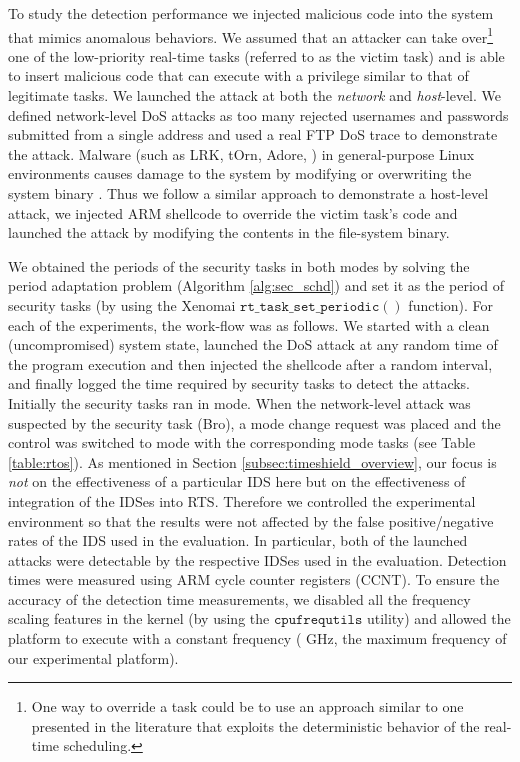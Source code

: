 \documentclass[../rt_server_main.tex]{subfiles}
\begin{document}
To study the detection performance we injected malicious code into the system that mimics anomalous behaviors.  We assumed that an attacker can take over\footnote{One way to override a task could be to use an approach similar to one presented in the literature \cite{cy_side_channel} that exploits the deterministic behavior of the real-time scheduling.} one of the low-priority real-time tasks (referred to as the victim task) and is able to insert malicious code that can execute with a privilege similar to that of legitimate tasks.
We launched the attack at both the \textit{network} and \textit{host}-level. We defined network-level DoS attacks as too many rejected usernames and passwords submitted from a single address and used a real FTP DoS trace \cite{bro_dos} to demonstrate the attack. Malware (such as LRK, tOrn, Adore, \etc) in general-purpose Linux environments causes damage to the system by modifying or overwriting the system binary \cite[Ch. 5]{linux_hack}. Thus we follow a similar approach to demonstrate a host-level attack, \viz we injected ARM shellcode \cite{arm_shellcode} to override the victim task's code and launched the attack by modifying the contents in the file-system binary. %

We obtained the periods of the security tasks in both modes by solving the period adaptation problem (Algorithm \ref{alg:sec_schd}) and set it as the period of security tasks (by using the Xenomai $\mathtt{rt\_task\_set\_periodic()}$ function). For each of the experiments, the work-flow was as follows. We started with a clean (\eg uncompromised) system state, launched the DoS attack at any random time of the program execution and then injected the shellcode after a random interval, and finally logged the time required by security tasks  to detect the attacks. Initially the security tasks ran in \pve mode. When the network-level attack was suspected by the security task (\eg Bro), a mode change request was placed and the control was switched to \ave mode with the corresponding \ave mode tasks (see Table \ref{table:rtos}).  %
As mentioned in Section \ref{subsec:timeshield_overview}, our focus is \textit{not} on the effectiveness of a particular IDS here but on the effectiveness of integration of the IDSes into RTS. Therefore  we controlled the experimental environment so that the results were not affected by the false positive/negative rates of the IDS used in the evaluation. In particular, both of the launched attacks were detectable by the respective IDSes used in the evaluation. Detection times were measured using ARM cycle counter registers (CCNT). To ensure the accuracy of the detection time measurements, we disabled all the frequency scaling features in the kernel (by using the $\mathtt{cpufrequtils}$ utility) and allowed the platform to execute with a constant frequency ( GHz, the maximum frequency of our experimental platform).
\end{document}
